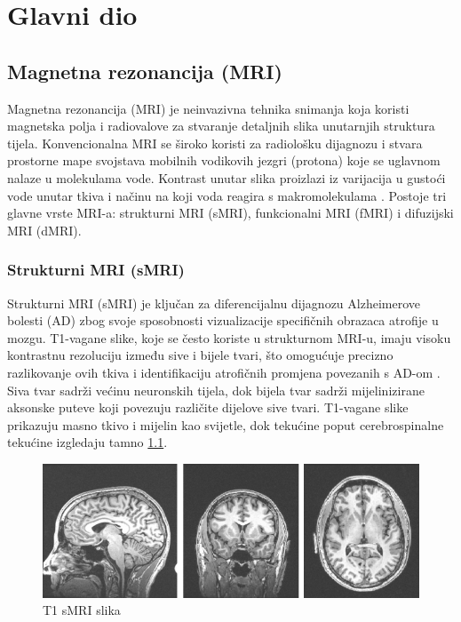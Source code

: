 \documentclass[zavrsnirad]{fer}
\begin{document}
\chapter{Glavni dio}
\label{pog:glavni_dio}

\section{Magnetna rezonancija (MRI)}

Magnetna rezonancija (MRI) je neinvazivna tehnika snimanja koja koristi magnetska polja i radiovalove za stvaranje detaljnih slika unutarnjih struktura tijela. Konvencionalna MRI se široko koristi za radiološku dijagnozu i stvara prostorne mape svojstava mobilnih vodikovih jezgri (protona) koje se uglavnom nalaze u molekulama vode. Kontrast unutar slika proizlazi iz varijacija u gustoći vode unutar tkiva i načinu na koji voda reagira s makromolekulama \cite{Gore2003}. Postoje tri glavne vrste MRI-a: strukturni MRI (sMRI), funkcionalni MRI (fMRI) i difuzijski MRI (dMRI).


\subsection{Strukturni MRI (sMRI)}
Strukturni MRI (sMRI) je ključan za diferencijalnu dijagnozu Alzheimerove bolesti (AD) zbog svoje sposobnosti vizualizacije specifičnih obrazaca atrofije u mozgu. T1-vagane slike, koje se često koriste u strukturnom MRI-u, imaju visoku kontrastnu rezoluciju između sive i bijele tvari, što omogućuje precizno razlikovanje ovih tkiva i identifikaciju atrofičnih promjena povezanih s AD-om \cite{Gonuguntla2022}. Siva tvar sadrži većinu neuronskih tijela, dok bijela tvar sadrži mijelinizirane aksonske puteve koji povezuju različite dijelove sive tvari. T1-vagane slike prikazuju masno tkivo i mijelin kao svijetle, dok tekućine poput cerebrospinalne tekućine izgledaju tamno \ref{fig:sMRI_T1}.

\begin{figure}[h]
	\centering
	\includegraphics[width=1\textwidth]{Figures/T1_sMRI.png}
	\caption{T1 sMRI slika \cite{ucsd2021}}
	\label{fig:sMRI_T1}
\end{figure}
\end{document}
